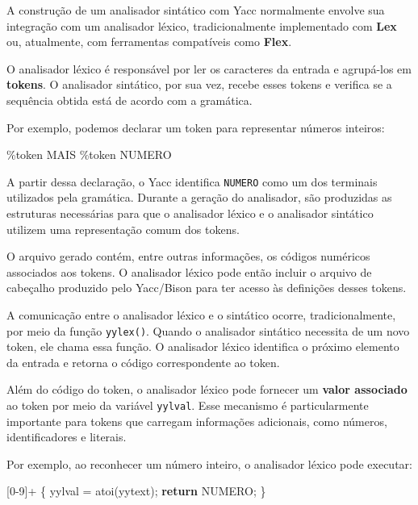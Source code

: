 \documentclass[
  brazilian,
  letterpaper,
]{book}
\newenvironment{Shaded}{\begin{snugshade}}{\end{snugshade}}
\newcommand{\ControlFlowTok}[1]{\textcolor[rgb]{0.00,0.23,0.31}{\textbf{#1}}}
\newcommand{\DecValTok}[1]{\textcolor[rgb]{0.68,0.00,0.00}{#1}}
\newcommand{\NormalTok}[1]{\textcolor[rgb]{0.00,0.23,0.31}{#1}}
\newcommand{\OperatorTok}[1]{\textcolor[rgb]{0.37,0.37,0.37}{#1}}
\theoremstyle{plain}
\theoremstyle{definition}
\theoremstyle{remark}
\begin{document}
A construção de um analisador sintático com Yacc normalmente envolve sua
integração com um analisador léxico, tradicionalmente implementado com
\textbf{Lex} ou, atualmente, com ferramentas compatíveis como
\textbf{Flex}.

O analisador léxico é responsável por ler os caracteres da entrada e
agrupá-los em \textbf{tokens}. O analisador sintático, por sua vez,
recebe esses tokens e verifica se a sequência obtida está de acordo com
a gramática.

Por exemplo, podemos declarar um token para representar números
inteiros:

\begin{Shaded}
\begin{Highlighting}[]
\OperatorTok{\%}\NormalTok{token MAIS}
\OperatorTok{\%}\NormalTok{token NUMERO}
\end{Highlighting}
\end{Shaded}

A partir dessa declaração, o Yacc identifica \texttt{NUMERO} como um dos
terminais utilizados pela gramática. Durante a geração do analisador,
são produzidas as estruturas necessárias para que o analisador léxico e
o analisador sintático utilizem uma representação comum dos tokens.

O arquivo gerado contém, entre outras informações, os códigos numéricos
associados aos tokens. O analisador léxico pode então incluir o arquivo
de cabeçalho produzido pelo Yacc/Bison para ter acesso às definições
desses tokens.

A comunicação entre o analisador léxico e o sintático ocorre,
tradicionalmente, por meio da função \texttt{yylex()}. Quando o
analisador sintático necessita de um novo token, ele chama essa função.
O analisador léxico identifica o próximo elemento da entrada e retorna o
código correspondente ao token.

Além do código do token, o analisador léxico pode fornecer um
\textbf{valor associado} ao token por meio da variável \texttt{yylval}.
Esse mecanismo é particularmente importante para tokens que carregam
informações adicionais, como números, identificadores e literais.

Por exemplo, ao reconhecer um número inteiro, o analisador léxico pode
executar:

\begin{Shaded}
\begin{Highlighting}[]
\OperatorTok{[}\DecValTok{0}\OperatorTok{{-}}\DecValTok{9}\OperatorTok{]+} \OperatorTok{\{}
\NormalTok{    yylval }\OperatorTok{=}\NormalTok{ atoi}\OperatorTok{(}\NormalTok{yytext}\OperatorTok{);}
    \ControlFlowTok{return}\NormalTok{ NUMERO}\OperatorTok{;}
\OperatorTok{\}}
\end{Highlighting}
\end{Shaded}
\end{document}
